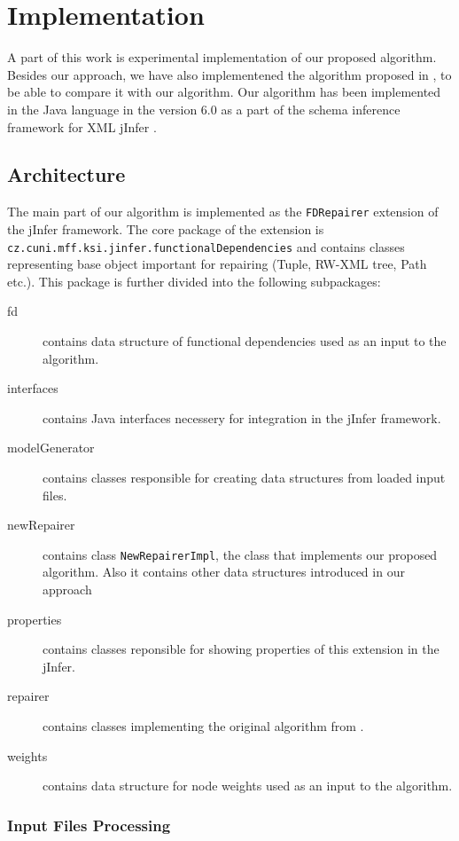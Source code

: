 \chapter{Implementation}

A part of this work is experimental implementation of our proposed algorithm. Besides our approach, we have also implementened the algorithm proposed in \cite{RepAndConsistentAnswer}, to be able to compare it with our algorithm. Our algorithm has been implemented in the Java language in the version 6.0 as a part of the schema inference framework for XML jInfer \cite{jinfer}.

\section{Architecture}

The main part of our algorithm is implemented as the \texttt{FDRepairer} extension of the jInfer framework. The core package of the extension is \texttt{cz.cuni.mff.\discretionary{}{}{}ksi.jinfer.functionalDependencies} and contains classes representing base object important for repairing (Tuple, RW-XML tree, Path etc.). This package is further divided into the following subpackages:

\begin{description}
	\item[fd] contains data structure of functional dependencies used as an input to the algorithm.
    \item [interfaces] contains Java interfaces necessery for integration in the jInfer framework.
    \item [modelGenerator] contains classes responsible for creating data structures from loaded input files.
    \item [newRepairer] contains class \texttt{NewRepairerImpl}, the class that implements our proposed algorithm. Also it contains other data structures introduced in our approach
    \item [properties] contains classes reponsible for showing properties of this extension in the jInfer.
    \item [repairer] contains classes implementing the original algorithm from \cite{RepAndConsistentAnswer}.
    \item [weights] contains data structure for node weights used as an input to the algorithm.
\end{description}

\subsection{Input Files Processing}

